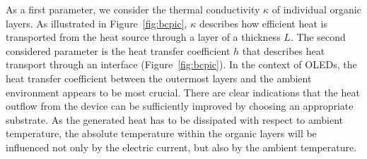 \documentclass[%
9pt,
 aip,
rsi,%
 amsmath,amssymb,
preprint,%
]{revtex4-1}
\begin{document}
As a first parameter, we consider the thermal conductivity $\kappa$ of individual organic layers. 
As illustrated in Figure~\ref{fig:bcpic}, $\kappa$ describes how efficient heat is transported from the heat source through a layer of a thickness $L$. 
%
The second considered parameter is the heat transfer coefficient $h$ that describes heat transport through an interface (Figure~\ref{fig:bcpic}).\cite{Jin2014}
In the context of OLEDs, the heat transfer coefficient between the outermost layers and the ambient environment  appears to be most crucial.
There are clear indications that the heat outflow from the device can be sufficiently improved by choosing an appropriate substrate.\cite{Chung2009,Triambulo2016} 
As the generated heat has to be dissipated with respect to ambient temperature, the absolute temperature within the organic layers will be influenced not only by the electric current, but also by the ambient temperature.

\end{document}
